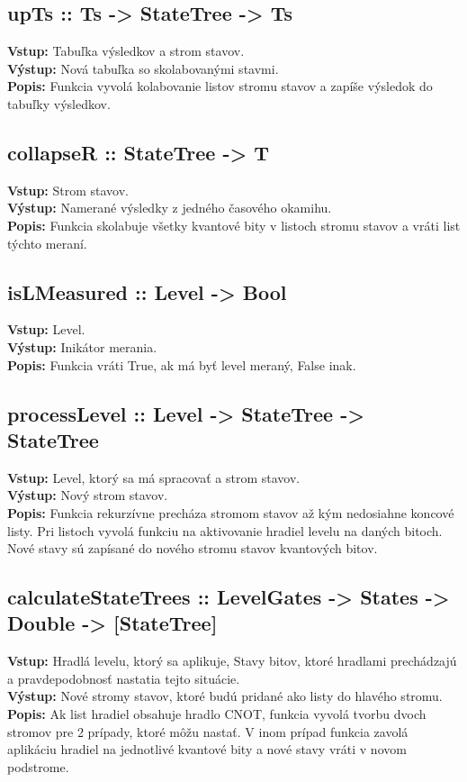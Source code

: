 \subsection*{upTs :: Ts -> StateTree -> Ts}
\textbf{Vstup:} Tabuľka výsledkov a strom stavov.\\
\textbf{Výstup:} Nová tabuľka so skolabovanými stavmi.\\
\textbf{Popis:} Funkcia vyvolá kolabovanie listov stromu stavov a zapíše 
výsledok do tabuľky výsledkov.

\subsection*{collapseR :: StateTree -> T}
\textbf{Vstup:} Strom stavov.\\
\textbf{Výstup:} Namerané výsledky z jedného časového okamihu.\\
\textbf{Popis:} Funkcia skolabuje všetky kvantové bity v listoch stromu 
stavov a vráti list týchto meraní.

\subsection*{isLMeasured :: Level -> Bool}
\textbf{Vstup:} Level.\\
\textbf{Výstup:} Inikátor merania.\\
\textbf{Popis:} Funkcia vráti True, ak má byť level meraný, False inak.

\subsection*{processLevel :: Level -> StateTree -> StateTree}
\textbf{Vstup:} Level, ktorý sa má spracovať a strom stavov.\\
\textbf{Výstup:} Nový strom stavov.\\
\textbf{Popis:} Funkcia rekurzívne precháza stromom stavov až kým nedosiahne
koncové listy. Pri listoch vyvolá funkciu na aktivovanie hradiel levelu na 
daných bitoch. Nové stavy sú zapísané do nového stromu stavov kvantových bitov.

\subsection*{calculateStateTrees ::  LevelGates -> States -> Double -> [StateTree]}
\textbf{Vstup:} Hradlá levelu, ktorý sa aplikuje, Stavy bitov, ktoré hradlami
prechádzajú a pravdepodobnosť nastatia tejto situácie.\\
\textbf{Výstup:} Nové stromy stavov, ktoré budú pridané ako listy do hlavého
stromu.\\
\textbf{Popis:} Ak list hradiel obsahuje hradlo CNOT, funkcia vyvolá tvorbu
dvoch stromov pre 2 prípady, ktoré môžu nastať. V inom prípad funkcia zavolá
aplikáciu hradiel na jednotlivé kvantové bity a nové stavy vráti v novom 
podstrome.

